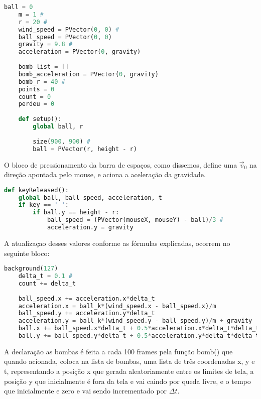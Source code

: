 \documentclass[12pt,letterpaper]{article}
\begin{document}
\begin{lstlisting}[language=Python]
    ball = 0
    m = 1 #
    r = 20 #
    wind_speed = PVector(0, 0) #
    ball_speed = PVector(0, 0)
    gravity = 9.8 #
    acceleration = PVector(0, gravity)
    
    bomb_list = []
    bomb_acceleration = PVector(0, gravity)
    bomb_r = 40 #
    points = 0
    count = 0
    perdeu = 0
    
    def setup():
        global ball, r
        
        size(900, 900) #
        ball = PVector(r, height - r)
\end{lstlisting}

O bloco de pressionamento da barra de espaços, como dissemos, define uma $\vec{v}_0$ na direção apontada pelo mouse, e aciona a aceleração da gravidade.

\begin{lstlisting}[language=Python]
    def keyReleased():
    global ball, ball_speed, acceleration, t
    if key == ' ':
        if ball.y == height - r:
            ball_speed = (PVector(mouseX, mouseY) - ball)/3 #
            acceleration.y = gravity
\end{lstlisting}
A atualizaçao desses valores conforme as fórmulas explicadas, ocorrem no seguinte bloco:

\begin{lstlisting}[language=Python]
    background(127)
    delta_t = 0.1 #
    count += delta_t
    
    ball_speed.x += acceleration.x*delta_t
    acceleration.x = ball_k*(wind_speed.x - ball_speed.x)/m
    ball_speed.y += acceleration.y*delta_t
    acceleration.y = ball_k*(wind_speed.y - ball_speed.y)/m + gravity
    ball.x += ball_speed.x*delta_t + 0.5*acceleration.x*delta_t*delta_t
    ball.y += ball_speed.y*delta_t + 0.5*acceleration.y*delta_t*delta_t
\end{lstlisting}

A declaração as bombas é feita a cada 100 frames pela função bomb() que quando acionada, coloca na lista de bombas, uma lista de três coordenadas x, y e t, representando a posição x que gerada aleatoriamente entre os limites de tela, a posição y que inicialmente é fora da tela e vai caindo por queda livre, e o tempo que inicialmente e zero e vai sendo incrementado por $\Delta t$.
\end{document}
